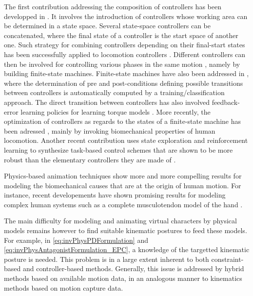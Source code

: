 {{The first contribution addressing the composition of controllers has been developped in . It involves the introduction of controllers whose working area can be determined in a state space. Several state-space controllers can be concatenated, where the final state of a controller is the start space of another one. Such strategy for combining controllers depending on their final-start states has been successfully applied to locomotion controllers . Different controllers can then be involved for controlling various phases in the same motion , namely by building finite-state machines. Finite-state machines have also been addressed in , where the determination of pre and post-conditions defining possible transitions between controllers is automatically computed by a training/classification approach. The direct transition between controllers has also involved feedback-error learning policies for learning torque models . More recently, the optimization of controllers as regards to the states of a finite-state machine has been adressed , mainly by invoking biomechanical properties of human locomotion. Another recent contribution uses state exploration and reinforcement learning to synthesize task-based control schemes that are shown to be more robust than the elementary controllers they are made of .


				\label{subsubsubsec:CA_MC_Physics_Conclu}

Physics-based animation techniques show more and more compelling results for modeling the biomechanical causes that are at the origin of human motion. For instance, recent developements have shown promising results for modeling complex human systems such as a complete musculotendon model of the hand .

The main difficulty for modeling and animating virtual characters by physical models remains however to find suitable kinematic postures to feed these models. For example, in \myequname \eqref{eq:invPhysPDFormulation} and \eqref{eq:invPhysAntagonistFormulation_EPC}, a knowledge of the targetted kinematic posture is needed. This problem is in a large extent inherent to both constraint-based and controller-based methods. Generally, this issue is addressed by hybrid methods based on available motion data, in an analogous manner to kinematics methods based on motion  capture data.


}}
